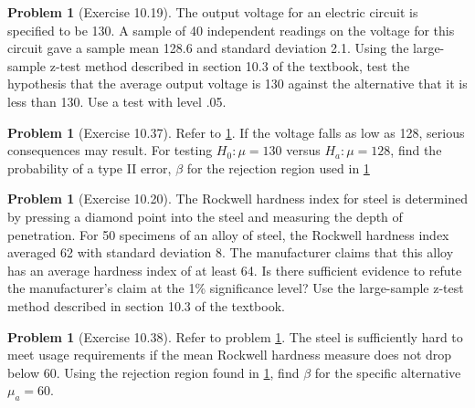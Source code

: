 \documentclass[10pt]{article}
\theoremstyle{definition}
\newtheorem{problem}[theorem]{Problem}
\newcommand{\1}[1]{\textbf{1}_{\left[#1\right]}} %
\begin{document}
\begin{problem}[Exercise 10.19]
  \label{problem:exercise-10.19}
  The output voltage for an electric circuit is speciﬁed to be 130. A sample
  of 40 independent readings on the voltage for this circuit gave a sample
  mean 128.6 and standard deviation 2.1. Using the large-sample z-test method
  described in section 10.3 of the textbook, test the hypothesis that the average
  output voltage is 130 against the alternative that it is less than 130. Use
  a test with level .05.
\end{problem}


\begin{problem}[Exercise 10.37]
  Refer to \cref{problem:exercise-10.19}. If the voltage falls as low as 128,
  serious consequences may result. For testing $H_{0}: \mu=130$ versus
  $H_{a}:\mu=128$, ﬁnd the probability of a type II error, $\beta$ for the
  rejection region used in \cref{problem:exercise-10.19}
\end{problem}


\begin{problem}[Exercise 10.20]
  \label{problem:exercise-10.20}
  The Rockwell hardness index for steel is determined by pressing a diamond
  point into the steel and measuring the depth of penetration. For 50
  specimens of an alloy of steel, the Rockwell hardness index averaged 62 with
  standard deviation 8. The manufacturer claims that this alloy has an average
  hardness index of at least 64. Is there sufficient evidence to refute the
  manufacturer's claim at the 1\% significance level? Use the large-sample
  z-test method described in section 10.3 of the textbook.
\end{problem}


\begin{problem}[Exercise 10.38]
  Refer to problem \cref{problem:exercise-10.20}. The steel is sufficiently
  hard to meet usage requirements if the mean Rockwell hardness measure does
  not drop below 60. Using the rejection region found in 
  \cref{problem:exercise-10.20}, find $\beta$ for the specific alternative
  $\mu_{a} = 60$.
\end{problem}
\end{document}
